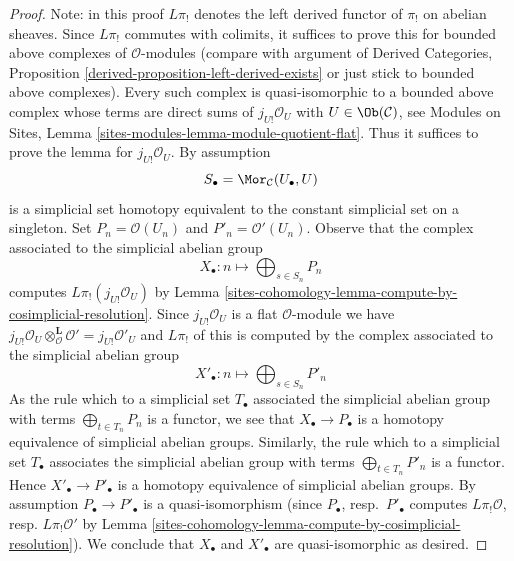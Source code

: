 \begin{proof}
Note: in this proof $L\pi_!$ denotes the left derived functor
of $\pi_!$ on abelian sheaves.
Since $L\pi_!$ commutes with colimits, it suffices
to prove this for bounded above complexes of $\mathcal{O}$-modules
(compare with argument of
Derived Categories, Proposition \ref{derived-proposition-left-derived-exists}
or just stick to bounded above complexes).
Every such complex is quasi-isomorphic to a bounded above complex
whose terms are direct sums of $j_{U!}\mathcal{O}_U$ with
$U \in \Ob(\mathcal{C})$, see
Modules on Sites, Lemma \ref{sites-modules-lemma-module-quotient-flat}.
Thus it suffices to prove the lemma
for $j_{U!}\mathcal{O}_U$. By assumption
$$
S_\bullet = \Mor_\mathcal{C}(U_\bullet, U)
$$
is a simplicial set homotopy equivalent to the constant simplicial
set on a singleton. Set $P_n = \mathcal{O}(U_n)$ and
$P'_n = \mathcal{O}'(U_n)$. Observe that the complex associated to the
simplicial abelian group
$$
X_\bullet : n \longmapsto \bigoplus\nolimits_{s \in S_n} P_n
$$
computes $L\pi_!(j_{U!}\mathcal{O}_U)$ by
Lemma \ref{sites-cohomology-lemma-compute-by-cosimplicial-resolution}.
Since $j_{U!}\mathcal{O}_U$ is a flat $\mathcal{O}$-module we have
$j_{U!}\mathcal{O}_U \otimes^\mathbf{L}_\mathcal{O} \mathcal{O}' =
j_{U!}\mathcal{O}'_U$ and $L\pi_!$ of this is computed by the complex
associated to the simplicial abelian group
$$
X'_\bullet : n \longmapsto \bigoplus\nolimits_{s \in S_n} P'_n
$$
As the rule which to a simplicial set $T_\bullet$ associated the simplicial
abelian group with terms $\bigoplus_{t \in T_n} P_n$ is a functor, we see
that $X_\bullet \to P_\bullet$ is a homotopy equivalence of simplicial
abelian groups. Similarly, the rule which to a simplicial set
$T_\bullet$ associates the simplicial abelian group with terms
$\bigoplus_{t \in T_n} P'_n$ is a functor. Hence $X'_\bullet \to P'_\bullet$
is a homotopy equivalence of simplicial abelian groups.
By assumption $P_\bullet \to P'_\bullet$ is a quasi-isomorphism
(since $P_\bullet$, resp.\ $P'_\bullet$ computes $L\pi_!\mathcal{O}$,
resp. $L\pi_!\mathcal{O}'$ by
Lemma \ref{sites-cohomology-lemma-compute-by-cosimplicial-resolution}).
We conclude that $X_\bullet$ and $X'_\bullet$ are quasi-isomorphic as desired.
\end{proof}


